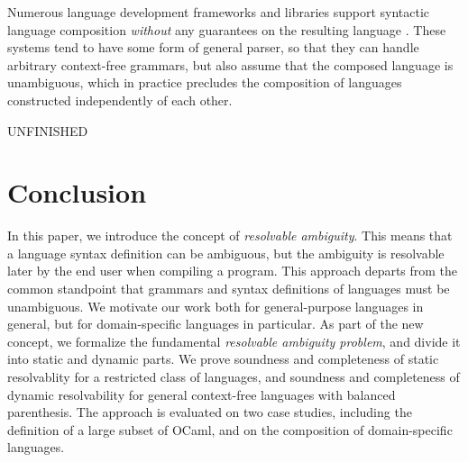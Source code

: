 \documentclass[acmsmall,review,anonymous]{acmart}\settopmatter{printfolios=true,printccs=false,printacmref=false}
\begin{document}
Numerous language development frameworks and libraries support syntactic language composition \emph{without} any guarantees on the resulting language \cite{heeringSyntaxDefinitionFormalism1989}. These systems tend to have some form of general parser, so that they can handle arbitrary context-free grammars, but also assume that the composed language is unambiguous, which in practice precludes the composition of languages constructed independently of each other.

UNFINISHED

\section{Conclusion}
In this paper, we introduce the concept of \emph{resolvable ambiguity}. This means that a language syntax definition can be ambiguous, but the ambiguity is resolvable later by the end user when compiling a program. This approach departs from the common standpoint that grammars and syntax definitions of languages must be unambiguous. We motivate our work both for general-purpose languages in general, but for domain-specific languages in particular. As part of the new concept, we formalize the fundamental \emph{resolvable ambiguity problem}, and divide it into static and dynamic parts. We prove soundness and completeness of static resolvablity for a restricted class of languages, and soundness and completeness of dynamic resolvability for general context-free languages with balanced parenthesis. The approach is evaluated on two case studies, including the definition of a large subset of OCaml, and on the composition of domain-specific languages.









\end{document}
